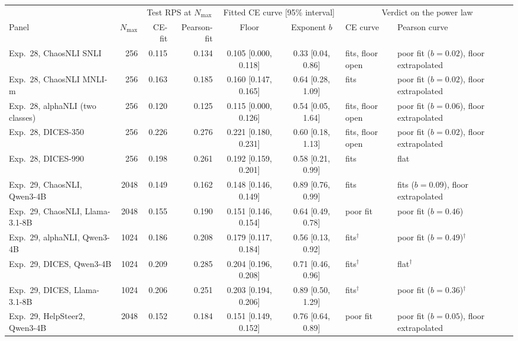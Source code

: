 \begin{tabular}{lrrrccll}
\toprule
 & & \multicolumn{2}{c}{Test RPS at $N_{\max}$} & \multicolumn{2}{c}{Fitted CE curve [95\% interval]} & \multicolumn{2}{c}{Verdict on the power law} \\
\cmidrule(lr){3-4}\cmidrule(lr){5-6}\cmidrule(lr){7-8}
Panel & $N_{\max}$ & CE-fit & Pearson-fit & Floor & Exponent $b$ & CE curve & Pearson curve \\
\midrule
Exp.\ 28, ChaosNLI SNLI & 256 & 0.115 & 0.134 & 0.105 [0.000, 0.118] & 0.33 [0.04, 0.86] & fits, floor open & poor fit ($b=0.02$), floor extrapolated \\
Exp.\ 28, ChaosNLI MNLI-m & 256 & 0.163 & 0.185 & 0.160 [0.147, 0.165] & 0.64 [0.28, 1.09] & fits & poor fit ($b=0.02$), floor extrapolated \\
Exp.\ 28, alphaNLI (two classes) & 256 & 0.120 & 0.125 & 0.115 [0.000, 0.126] & 0.54 [0.05, 1.64] & fits, floor open & poor fit ($b=0.06$), floor extrapolated \\
Exp.\ 28, DICES-350 & 256 & 0.226 & 0.276 & 0.221 [0.180, 0.231] & 0.60 [0.18, 1.13] & fits, floor open & poor fit ($b=0.02$), floor extrapolated \\
Exp.\ 28, DICES-990 & 256 & 0.198 & 0.261 & 0.192 [0.159, 0.201] & 0.58 [0.21, 0.99] & fits & flat \\
Exp.\ 29, ChaosNLI, Qwen3-4B & 2048 & 0.149 & 0.162 & 0.148 [0.146, 0.149] & 0.89 [0.76, 0.99] & fits & fits ($b=0.09$), floor extrapolated \\
Exp.\ 29, ChaosNLI, Llama-3.1-8B & 2048 & 0.155 & 0.190 & 0.151 [0.146, 0.154] & 0.64 [0.49, 0.78] & poor fit & poor fit ($b=0.46$) \\
Exp.\ 29, alphaNLI, Qwen3-4B & 1024 & 0.186 & 0.208 & 0.179 [0.117, 0.184] & 0.56 [0.13, 0.92] & fits$^\dagger$ & poor fit ($b=0.49$)$^\dagger$ \\
Exp.\ 29, DICES, Qwen3-4B & 1024 & 0.209 & 0.285 & 0.204 [0.196, 0.208] & 0.71 [0.46, 0.96] & fits$^\dagger$ & flat$^\dagger$ \\
Exp.\ 29, DICES, Llama-3.1-8B & 1024 & 0.206 & 0.251 & 0.203 [0.194, 0.206] & 0.89 [0.50, 1.29] & fits$^\dagger$ & poor fit ($b=0.36$)$^\dagger$ \\
Exp.\ 29, HelpSteer2, Qwen3-4B & 2048 & 0.152 & 0.184 & 0.151 [0.149, 0.152] & 0.76 [0.64, 0.89] & poor fit & poor fit ($b=0.05$), floor extrapolated \\
\bottomrule
\end{tabular}
